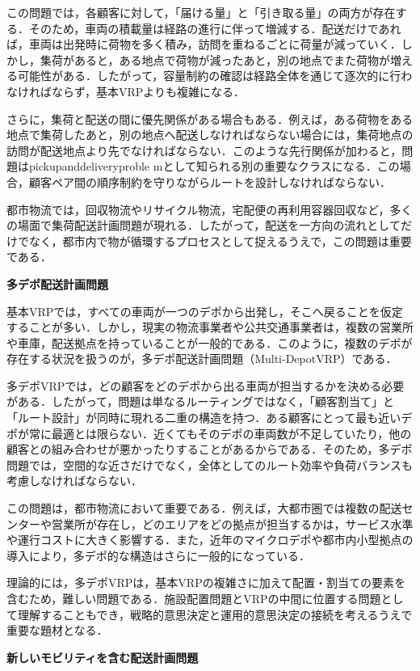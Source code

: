 この問題では，各顧客に対して，「届ける量」と「引き取る量」の両方が存在する．そのため，車両の積載量は経路の進行に伴って増減する．配送だけであれば，車両は出発時に荷物を多く積み，訪問を重ねるごとに荷量が減っていく．しかし，集荷があると，ある地点で荷物が減ったあと，別の地点でまた荷物が増える可能性がある．したがって，容量制約の確認は経路全体を通じて逐次的に行わなければならず，基本VRPよりも複雑になる．

さらに，集荷と配送の間に優先関係がある場合もある．例えば，ある荷物をある地点で集荷したあと，別の地点へ配送しなければならない場合には，集荷地点の訪問が配送地点より先でなければならない．このような先行関係が加わると，問題はpickupanddeliveryproble mとして知られる別の重要なクラスになる．この場合，顧客ペア間の順序制約を守りながらルートを設計しなければならない．

都市物流では，回収物流やリサイクル物流，宅配便の再利用容器回収など，多くの場面で集荷配送計画問題が現れる．したがって，配送を一方向の流れとしてだけでなく，都市内で物が循環するプロセスとして捉えるうえで，この問題は重要である．

\textbf{多デポ配送計画問題}

基本VRPでは，すべての車両が一つのデポから出発し，そこへ戻ることを仮定することが多い．しかし，現実の物流事業者や公共交通事業者は，複数の営業所や車庫，配送拠点を持っていることが一般的である．このように，複数のデポが存在する状況を扱うのが，多デポ配送計画問題（Multi-DepotVRP）である\cite{CHAN2001803}．

多デポVRPでは，どの顧客をどのデポから出る車両が担当するかを決める必要がある．したがって，問題は単なるルーティングではなく，「顧客割当て」と「ルート設計」が同時に現れる二重の構造を持つ．ある顧客にとって最も近いデポが常に最適とは限らない．近くてもそのデポの車両数が不足していたり，他の顧客との組み合わせが悪かったりすることがあるからである．そのため，多デポ問題では，空間的な近さだけでなく，全体としてのルート効率や負荷バランスも考慮しなければならない．

この問題は，都市物流において重要である．例えば，大都市圏では複数の配送センターや営業所が存在し，どのエリアをどの拠点が担当するかは，サービス水準や運行コストに大きく影響する．また，近年のマイクロデポや都市内小型拠点の導入により，多デポ的な構造はさらに一般的になっている．

理論的には，多デポVRPは，基本VRPの複雑さに加えて配置・割当ての要素を含むため，難しい問題である．施設配置問題とVRPの中間に位置する問題として理解することもでき，戦略的意思決定と運用的意思決定の接続を考えるうえで重要な題材となる．

\textbf{新しいモビリティを含む配送計画問題}

